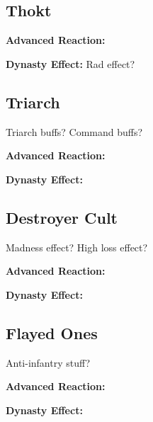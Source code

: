 \subsection{Thokt}

\textbf{Advanced Reaction:}

\textbf{Dynasty Effect:} Rad effect?


\subsection{Triarch}

Triarch buffs? Command buffs?

\textbf{Advanced Reaction:}

\textbf{Dynasty Effect:}


\subsection{Destroyer Cult}

Madness effect? High loss effect?

\textbf{Advanced Reaction:}

\textbf{Dynasty Effect:}


\subsection{Flayed Ones}

Anti-infantry stuff?

\textbf{Advanced Reaction:}

\textbf{Dynasty Effect:}